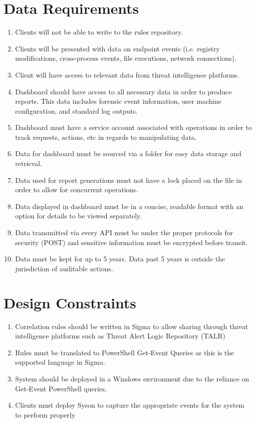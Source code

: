 \documentclass{scrreprt}
\begin{document}
\section{Data Requirements}

\begin{enumerate}[label*=D\arabic*.]
\item Clients will not be able to write to the rules repository.
\item Clients will be presented with data on endpoint events (i.e. registry modifications, cross-process events, file executions, network connections).
\item Client will have access to relevant data from threat intelligence platforms.
\item Dashboard should have access to all necessary data in order to produce reports. This data includes forensic event information, user machine configuration, and standard log outputs.
\item Dashboard must have a service account associated with operations in order to track requests, actions, etc in regards to manipulating data.
\item Data for dashboard must be sourced via a folder for easy data storage and retrieval. 
\item Data used for report generations must not have a lock placed on the file in order to allow for concurrent operations.
\item Data displayed in dashboard must be in a concise, readable format with an option for details to be viewed separately. 
\item Data transmitted via every API must be under the proper protocols for security (POST) and sensitive information must be encrypted before transit.
\item Data must be kept for up to 5 years. Data past 5 years is outside the jurisdiction of auditable actions. 
\end{enumerate}


\section{Design Constraints}

\begin{enumerate}[label*=DR\arabic*.]
\item Correlation rules should be written in Sigma to allow sharing through threat intelligence platforms such as Threat Alert Logic Repository (TALR)
\item Rules must be translated to PowerShell Get-Event Queries as this is the supported language in Sigma.
\item System should be deployed in a Windows environment due to the reliance on Get-Event PowerShell queries.
\item Clients must deploy Syson to capture the appropriate events for the system to perform properly

\end{enumerate}

\begin{thebibliography}{9}

\end{thebibliography}
\end{document}
